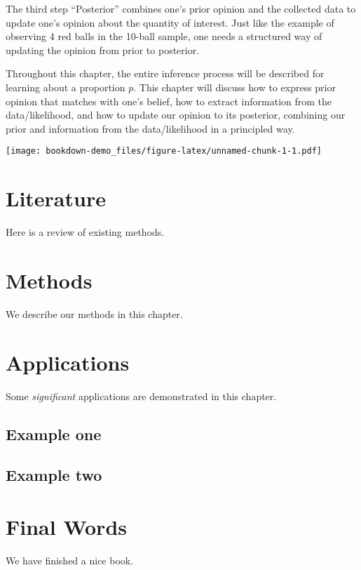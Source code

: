 \documentclass[]{book}
\begin{document}
The third step ``Posterior'' combines one's prior opinion and the collected data to update one's opinion about the quantity of interest. Just like the example of observing 4 red balls in the 10-ball sample, one needs a structured way of updating the opinion from prior to posterior.

Throughout this chapter, the entire inference process will be described for learning about a proportion \(p\). This chapter will discuss how to express prior opinion that matches with one's belief, how to extract information from the data/likelihood, and how to update our opinion to its posterior, combining our prior and information from the data/likelihood in a principled way.

\texttt{[image: bookdown-demo\_files/figure-latex/unnamed-chunk-1-1.pdf]}

\hypertarget{literature}{%
\chapter{Literature}\label{literature}}

Here is a review of existing methods.

\hypertarget{methods}{%
\chapter{Methods}\label{methods}}

We describe our methods in this chapter.

\hypertarget{applications}{%
\chapter{Applications}\label{applications}}

Some \emph{significant} applications are demonstrated in this chapter.

\hypertarget{example-one}{%
\section{Example one}\label{example-one}}

\hypertarget{example-two}{%
\section{Example two}\label{example-two}}

\hypertarget{final-words}{%
\chapter{Final Words}\label{final-words}}

We have finished a nice book.


\end{document}
